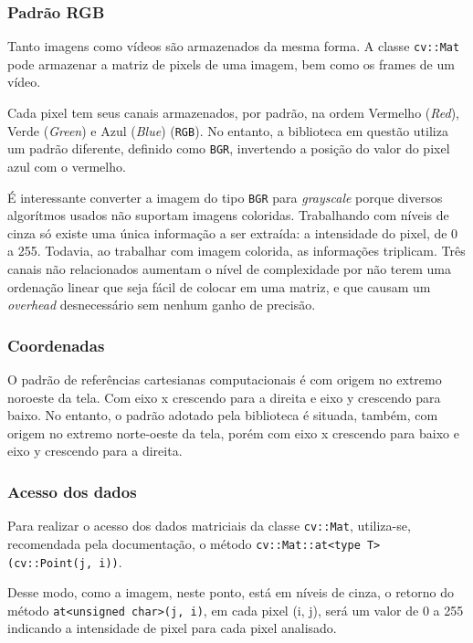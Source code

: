 \documentclass[10pt,twocolumn,letterpaper]{article}
\begin{document}
\subsubsection{Padrão RGB}

	Tanto imagens como vídeos são armazenados da mesma forma. A classe
\verb'cv::Mat' pode armazenar a matriz de pixels de uma imagem, bem como os
frames de um vídeo.

	Cada pixel tem seus canais armazenados, por padrão, na ordem Vermelho ({\em Red}),
Verde ({\em Green}) e Azul ({\em Blue}) (\verb'RGB'). No entanto, a biblioteca em questão
utiliza um padrão diferente, definido como \verb'BGR', invertendo a posição do valor do
pixel azul com o vermelho.

	É interessante converter a imagem do tipo \verb'BGR' para \emph{grayscale} porque
diversos algorítmos usados não suportam imagens coloridas.
Trabalhando com níveis de cinza só existe uma única informação
a ser extraída: a intensidade do pixel, de 0 a 255. Todavia, ao trabalhar com imagem
colorida, as informações triplicam. Três canais não relacionados aumentam o nível de
complexidade por não terem uma ordenação linear que seja fácil de colocar em uma matriz,
e que causam um \emph{overhead} desnecessário sem nenhum ganho de precisão.


\subsubsection{Coordenadas}

	O padrão de referências cartesianas computacionais é com origem no extremo noroeste
da tela. Com eixo x crescendo para a direita e eixo y crescendo para baixo. No entanto,
o padrão adotado pela biblioteca é situada, também, com origem no extremo norte-oeste da tela,
porém com eixo x crescendo para baixo e eixo y crescendo para a direita.


\subsubsection{Acesso dos dados}

	Para realizar o acesso dos dados matriciais da classe \verb'cv::Mat', utiliza-se,
recomendada pela documentação\cite{devdocs}, o método
\verb'cv::Mat::at<type T> (cv::Point(j, i))'. 

	Desse modo, como a imagem, neste ponto, está em níveis de cinza, o retorno
do método \verb'at<unsigned char>(j, i)', em cada pixel (i, j), será um valor de
0 a 255 indicando a intensidade de pixel para cada pixel analisado.
\end{document}
